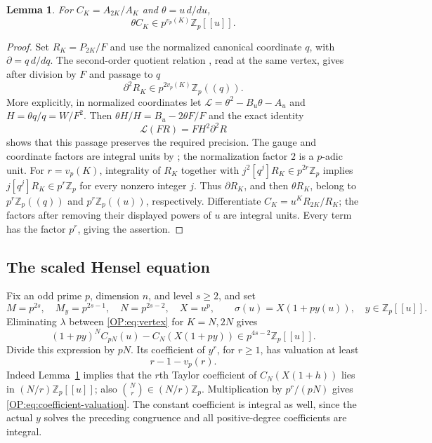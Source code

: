 \documentclass[11pt,a4paper]{article}
\newtheorem{lemma}[theorem]{Lemma}
\theoremstyle{definition}\newtheorem{definition}[theorem]{Definition}
\theoremstyle{remark}\newtheorem{remark}[theorem]{Remark}
\newcommand{\Z}{\mathbb Z}
\newcommand{\vp}{v_p}
\numberwithin{equation}{section}
\begin{document}
\begin{lemma}\label{OP:lem:derivative}
For $C_K=A_{2K}/A_K$ and $\theta=u\,d/du$,
\[
 \theta C_K\in p^{\vp(K)}\Z_p[[u]].
\]
\end{lemma}
\begin{proof}
Set $R_K=P_{2K}/F$ and use the normalized canonical coordinate $q$, with
$\partial=q\,d/dq$. The second-order quotient relation
\cite[Proposition 7.6]{BV3}, read at the same vertex, gives after division
by $F$ and passage to $q$
\[
 \partial^2R_K\in p^{2\vp(K)}\Z_p((q)).
\]
More explicitly, in normalized coordinates let
$\mathcal L=\theta^2-B_u\theta-A_u$ and $H=\theta q/q=W/F^2$.
Then $\theta H/H=B_u-2\theta F/F$ and the exact identity
\[
\mathcal L(FR)=FH^2\partial^2R
\]
shows that this passage preserves the required precision.
The gauge and coordinate factors are integral units by
\cite[Proposition 7.9 and Corollary 7.11]{BV3}; the normalization factor
$2$ is a $p$-adic unit. For $r=\vp(K)$, integrality of $R_K$ together
with $j^2[q^j]R_K\in p^{2r}\Z_p$ implies
$j[q^j]R_K\in p^r\Z_p$ for every nonzero integer $j$.
Thus $\partial R_K$, and then $\theta R_K$, belong to
$p^r\Z_p((q))$ and $p^r\Z_p((u))$, respectively.
Differentiate $C_K=u^K R_{2K}/R_K$; the factors after removing their
displayed powers of $u$ are integral units. Every term has the factor
$p^r$, giving the assertion.
\end{proof}

\subsection{The scaled Hensel equation}
Fix an odd prime $p$, dimension $n$, and level $s\ge2$, and set
\[
 M=p^{2s},\quad M_y=p^{2s-1},\quad N=p^{2s-2},\quad X=u^p,
 \qquad \sigma(u)=X(1+py(u)),\quad y\in\Z_p[[u]].
\]
Eliminating $\lambda$ between \eqref{OP:eq:vertex} for $K=N,2N$ gives
\[
 (1+py)^N C_{pN}(u)-C_N(X(1+py))
       \in p^{4s-2}\Z_p[[u]].
\]
Divide this expression by $pN$. Its coefficient of $y^r$, for $r\ge1$,
has valuation at least
\begin{equation}\label{OP:eq:coefficient-valuation}
 r-1-\vp(r).
\end{equation}
Indeed Lemma~\ref{OP:lem:derivative} implies that the $r$th Taylor
coefficient of $C_N(X(1+h))$ lies in $(N/r)\Z_p[[u]]$;
also $\binom Nr\in(N/r)\Z_p$. Multiplication by $p^r/(pN)$ gives
\eqref{OP:eq:coefficient-valuation}. The constant coefficient is integral
as well, since the actual $y$ solves the preceding congruence and all
positive-degree coefficients are integral.
\end{document}
